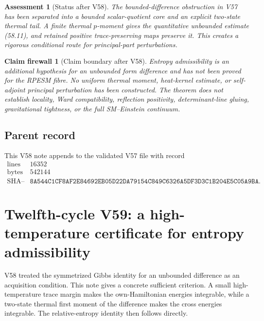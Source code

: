 \documentclass[11pt]{article}
\newtheorem{firewall}[theorem]{Claim firewall}
\newtheorem{assessment}[theorem]{Assessment}
\theoremstyle{remark}
\begin{document}
\begin{assessment}[Status after V58]
\label{ass:v12v58-status}
The bounded-difference obstruction in V57 has been separated into a
bounded scalar-quotient core and an explicit two-state thermal tail.
A finite thermal \(p\)-moment gives the quantitative unbounded
estimate (58.11), and retained positive trace-preserving maps
preserve it.  This creates a rigorous conditional route for
principal-part perturbations.
\end{assessment}

\begin{firewall}[Claim boundary after V58]
\label{fire:v12v58-claim}
Entropy admissibility is an additional hypothesis for an unbounded
form difference and has not been proved for the RPESM fibre.  No
uniform thermal moment, heat-kernel estimate, or self-adjoint
principal perturbation has been constructed.  The theorem does not
establish locality, Ward compatibility, reflection positivity,
determinant-line gluing, gravitational tightness, or the full
SM--Einstein continuum.
\end{firewall}

\subsection{Parent record}

This V58 note appends to the validated V57 file with record
\[
\begin{array}{c|c}
\text{lines}&16352\\
\text{bytes}&542144\\
\text{SHA--256}&
\texttt{8A544C1CF8AF2E84692EB05D22DA79154C849C6326A5DF3D3C1B204E5C05A9BA}.
\end{array}
\]


\section{Twelfth-cycle V59: a high-temperature certificate for
entropy admissibility}
\label{sec:v12v59}

V58 treated the symmetrized Gibbs identity for an unbounded
difference as an acquisition condition.  This note gives a concrete
sufficient criterion.  A small high-temperature trace margin makes
the own-Hamiltonian energies integrable, while a two-state thermal
first moment of the difference makes the cross energies integrable.
The relative-entropy identity then follows directly.
\end{document}
